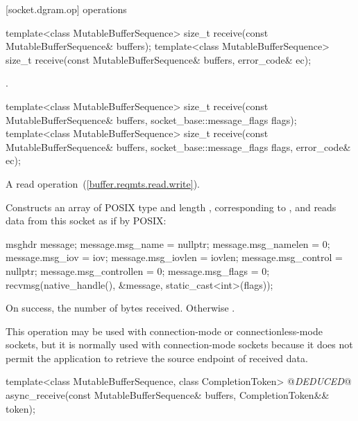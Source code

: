 [socket.dgram.op]{ operations}

\begin{itemdecl}
template<class MutableBufferSequence>
  size_t receive(const MutableBufferSequence& buffers);
template<class MutableBufferSequence>
  size_t receive(const MutableBufferSequence& buffers,
                 error_code& ec);
\end{itemdecl}

\begin{itemdescr}
\pnum
\returns {}.
\end{itemdescr}

\begin{itemdecl}
template<class MutableBufferSequence>
  size_t receive(const MutableBufferSequence& buffers,
                 socket_base::message_flags flags);
template<class MutableBufferSequence>
  size_t receive(const MutableBufferSequence& buffers,
                 socket_base::message_flags flags, error_code& ec);
\end{itemdecl}

\begin{itemdescr}
\pnum
A read operation~(\ref{buffer.reqmts.read.write}).

\pnum
\effects Constructs an array  of POSIX type  and length , corresponding to , and reads data from this socket as if by POSIX: 
\begin{codeblock}
msghdr message;
message.msg_name = nullptr;
message.msg_namelen = 0;
message.msg_iov = iov;
message.msg_iovlen = iovlen;
message.msg_control = nullptr;
message.msg_controllen = 0;
message.msg_flags = 0;
recvmsg(native_handle(), &message, static_cast<int>(flags));
\end{codeblock}


\pnum
\returns On success, the number of bytes received. Otherwise .

\pnum
 \enternote This operation may be used with connection-mode or connectionless-mode sockets, but it is normally used with connection-mode sockets because it does not permit the application to retrieve the source endpoint of received data. \exitnote
\end{itemdescr}

\begin{itemdecl}
template<class MutableBufferSequence, class CompletionToken>
  @\textit{DEDUCED}@ async_receive(const MutableBufferSequence& buffers,
                        CompletionToken&& token);
\end{itemdecl}

